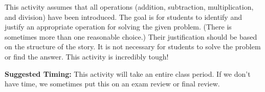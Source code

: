 \documentclass{ximera}
\begin{document}
\newpage
\begin{instructorNotes}
This activity assumes that all operations (addition, subtraction, multiplication, and division) have been introduced.  The goal is for students to identify and justify an appropriate operation for solving the given problem. (There is sometimes more than one reasonable choice.) Their justification should be based on the structure of the story. It is not necessary for students to solve the problem or find the answer.  This activity is incredibly tough!

{\bf Suggested Timing:} This activity will take an entire class period.  If we don't have time, we sometimes put this on an exam review or final review.
\end{instructorNotes}
\end{document}
